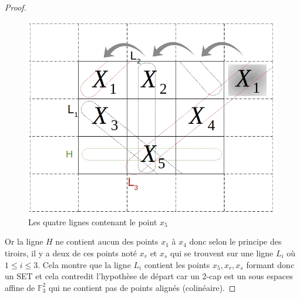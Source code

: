 \documentclass[a4paper,12pt,titlepage]{article}
\theoremstyle{plain}
\theoremstyle{definition}
\begin{document}
\begin{proof}
\begin{figure}[h!] %
\centering
\includegraphics[scale=0.4]{Img/Fig2Prop1.jpg}
\caption{Les quatre lignes contenant le point $x_5$}
\end{figure}
    
Or la ligne $H$ ne contient aucun des points $x_1$ à $x_4$ donc selon le principe des tiroirs, il y a deux de ces points noté $x_r$ et $x_s$ qui se trouvent sur une ligne $L_i$ où $1\le i \le 3$.
Cela montre que la ligne $L_i$ contient les points $x_5, x_r, x_s$ formant donc un SET et cela contredit l'hypothèse de départ car un 2-cap est un sous espaces affine de $\mathbb{F}_3^2$ qui ne contient pas de points alignés (colinéaire).
\end{proof}
\end{document}
